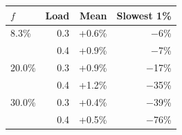 \begin{tabular}{@{}lrrr@{}}
\toprule
$f$ & Load & Mean & Slowest 1\% \\
\midrule
8.3\% & 0.3 & +0.6\% & $-$6\% \\
 & 0.4 & +0.9\% & $-$7\% \\
\midrule
20.0\% & 0.3 & +0.9\% & $-$17\% \\
 & 0.4 & +1.2\% & $-$35\% \\
\midrule
30.0\% & 0.3 & +0.4\% & $-$39\% \\
 & 0.4 & +0.5\% & $-$76\% \\
\bottomrule
\end{tabular}
